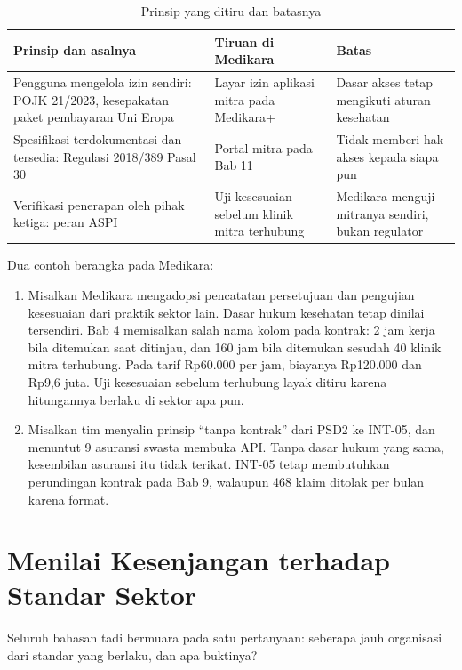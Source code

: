 \begin{table}[!htb]
  \centering
  \caption{Prinsip yang ditiru dan batasnya}
  \label{tab:ch07-pelajaran}
  \footnotesize
  \begin{tabularx}{\textwidth}{AAA}
    \hline
    \textbf{Prinsip dan asalnya} & \textbf{Tiruan di Medikara} & \textbf{Batas} \\ \hline
    Pengguna mengelola izin sendiri: POJK 21/2023, kesepakatan paket pembayaran Uni Eropa & Layar izin aplikasi mitra pada Medikara+ & Dasar akses tetap mengikuti aturan kesehatan \\ \hline
    Spesifikasi terdokumentasi dan tersedia: Regulasi 2018/389 Pasal 30 & Portal mitra pada Bab 11 & Tidak memberi hak akses kepada siapa pun \\ \hline
    Verifikasi penerapan oleh pihak ketiga: peran ASPI & Uji kesesuaian sebelum klinik mitra terhubung & Medikara menguji mitranya sendiri, bukan regulator \\ \hline
  \end{tabularx}
\end{table}

Dua contoh berangka pada Medikara:
\begin{enumerate}
  \item Misalkan Medikara mengadopsi pencatatan persetujuan dan pengujian kesesuaian dari praktik sektor lain. Dasar
        hukum kesehatan tetap dinilai tersendiri. Bab 4 memisalkan salah nama kolom pada kontrak: 2 jam kerja bila
        ditemukan saat ditinjau, dan 160 jam bila ditemukan sesudah 40 klinik mitra terhubung. Pada tarif Rp60.000 per
        jam, biayanya Rp120.000 dan Rp9,6 juta. Uji kesesuaian sebelum terhubung layak ditiru karena hitungannya
        berlaku di sektor apa pun.
  \item Misalkan tim menyalin prinsip ``tanpa kontrak'' dari PSD2 ke INT-05, dan menuntut 9 asuransi swasta membuka
        API. Tanpa dasar hukum yang sama, kesembilan asuransi itu tidak terikat. INT-05 tetap membutuhkan perundingan
        kontrak pada Bab 9, walaupun 468 klaim ditolak per bulan karena format.
\end{enumerate}

\section{Menilai Kesenjangan terhadap Standar Sektor}

Seluruh bahasan tadi bermuara pada satu pertanyaan: seberapa jauh organisasi dari standar yang berlaku, dan apa
buktinya?

